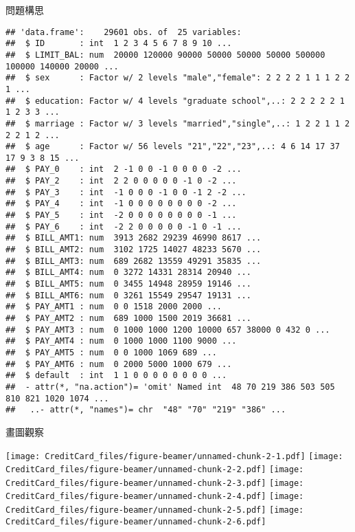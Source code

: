 \documentclass[ignorenonframetext,]{beamer}
\begin{document}
\begin{frame}[fragile]{問題構思}
\begin{verbatim}
## 'data.frame':    29601 obs. of  25 variables:
##  $ ID       : int  1 2 3 4 5 6 7 8 9 10 ...
##  $ LIMIT_BAL: num  20000 120000 90000 50000 50000 50000 500000 100000 140000 20000 ...
##  $ sex      : Factor w/ 2 levels "male","female": 2 2 2 2 1 1 1 2 2 1 ...
##  $ education: Factor w/ 4 levels "graduate school",..: 2 2 2 2 2 1 1 2 3 3 ...
##  $ marriage : Factor w/ 3 levels "married","single",..: 1 2 2 1 1 2 2 2 1 2 ...
##  $ age      : Factor w/ 56 levels "21","22","23",..: 4 6 14 17 37 17 9 3 8 15 ...
##  $ PAY_0    : int  2 -1 0 0 -1 0 0 0 0 -2 ...
##  $ PAY_2    : int  2 2 0 0 0 0 0 -1 0 -2 ...
##  $ PAY_3    : int  -1 0 0 0 -1 0 0 -1 2 -2 ...
##  $ PAY_4    : int  -1 0 0 0 0 0 0 0 0 -2 ...
##  $ PAY_5    : int  -2 0 0 0 0 0 0 0 0 -1 ...
##  $ PAY_6    : int  -2 2 0 0 0 0 0 -1 0 -1 ...
##  $ BILL_AMT1: num  3913 2682 29239 46990 8617 ...
##  $ BILL_AMT2: num  3102 1725 14027 48233 5670 ...
##  $ BILL_AMT3: num  689 2682 13559 49291 35835 ...
##  $ BILL_AMT4: num  0 3272 14331 28314 20940 ...
##  $ BILL_AMT5: num  0 3455 14948 28959 19146 ...
##  $ BILL_AMT6: num  0 3261 15549 29547 19131 ...
##  $ PAY_AMT1 : num  0 0 1518 2000 2000 ...
##  $ PAY_AMT2 : num  689 1000 1500 2019 36681 ...
##  $ PAY_AMT3 : num  0 1000 1000 1200 10000 657 38000 0 432 0 ...
##  $ PAY_AMT4 : num  0 1000 1000 1100 9000 ...
##  $ PAY_AMT5 : num  0 0 1000 1069 689 ...
##  $ PAY_AMT6 : num  0 2000 5000 1000 679 ...
##  $ default  : int  1 1 0 0 0 0 0 0 0 0 ...
##  - attr(*, "na.action")= 'omit' Named int  48 70 219 386 503 505 810 821 1020 1074 ...
##   ..- attr(*, "names")= chr  "48" "70" "219" "386" ...
\end{verbatim}

\end{frame}

\begin{frame}{畫圖觀察}

\texttt{[image: CreditCard\_files/figure-beamer/unnamed-chunk-2-1.pdf]}
\texttt{[image: CreditCard\_files/figure-beamer/unnamed-chunk-2-2.pdf]}
\texttt{[image: CreditCard\_files/figure-beamer/unnamed-chunk-2-3.pdf]}
\texttt{[image: CreditCard\_files/figure-beamer/unnamed-chunk-2-4.pdf]}
\texttt{[image: CreditCard\_files/figure-beamer/unnamed-chunk-2-5.pdf]}
\texttt{[image: CreditCard\_files/figure-beamer/unnamed-chunk-2-6.pdf]}

\end{frame}
\end{document}
